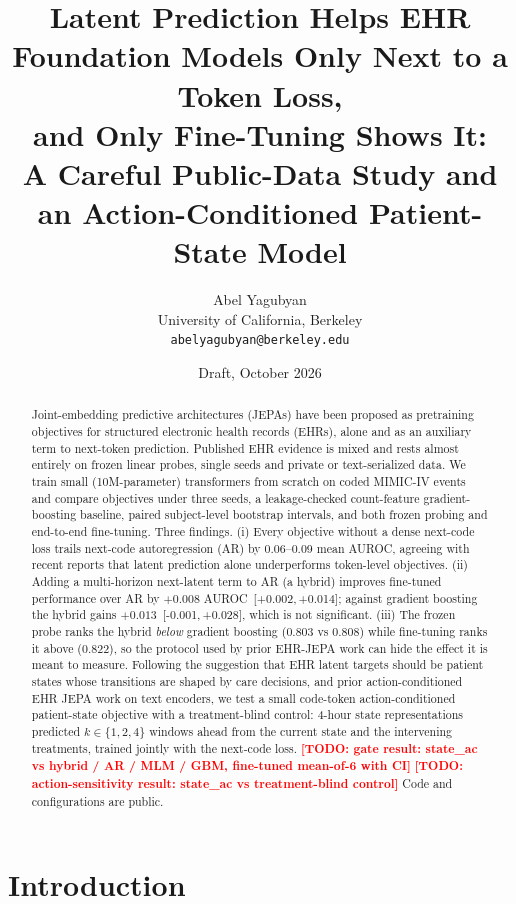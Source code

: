 \documentclass[10pt,letterpaper]{article}
\title{\textbf{Latent Prediction Helps EHR Foundation Models Only Next to a Token Loss,\\
and Only Fine-Tuning Shows It:\\
A Careful Public-Data Study and an Action-Conditioned Patient-State Model}}
\author{Abel Yagubyan\\
\small University of California, Berkeley\\
\small \texttt{abelyagubyan@berkeley.edu}}
\date{Draft, October 2026}
\newcommand{\todo}[1]{\textcolor{red}{\textbf{[TODO: #1]}}}
\newcommand{\ci}[2]{\,[{#1},\,{#2}]}
\begin{document}
\maketitle

\begin{abstract}
Joint-embedding predictive architectures (JEPAs) have been proposed as
pretraining objectives for structured electronic health records (EHRs), alone
and as an auxiliary term to next-token prediction. Published EHR evidence is
mixed and rests almost entirely on frozen linear probes, single seeds and
private or text-serialized data. We train small (10M-parameter) transformers
from scratch on coded MIMIC-IV events and compare objectives under three
seeds, a leakage-checked count-feature gradient-boosting baseline, paired
subject-level bootstrap intervals, and both frozen probing and end-to-end
fine-tuning. Three findings. (i) Every objective without a dense next-code loss
trails next-code autoregression (AR) by 0.06--0.09 mean AUROC, agreeing with
recent reports that latent prediction alone underperforms token-level
objectives. (ii) Adding a multi-horizon next-latent term to AR (a hybrid)
improves fine-tuned performance over AR by $+0.008$ AUROC
\ci{+0.002}{+0.014}; against gradient boosting the hybrid gains $+0.013$
\ci{-0.001}{+0.028}, which is not significant. (iii) The frozen probe ranks the
hybrid \emph{below} gradient boosting (0.803 vs 0.808) while fine-tuning ranks it
above (0.822), so the protocol used by prior EHR-JEPA work can hide the effect
it is meant to measure. Following the suggestion that EHR latent targets
should be patient states whose transitions are shaped by care decisions, and
prior action-conditioned EHR JEPA work on text encoders, we test a small
code-token action-conditioned patient-state objective with a treatment-blind control: 4-hour state
representations predicted $k\in\{1,2,4\}$ windows ahead from the current state and
the intervening treatments, trained jointly with the next-code loss.
\todo{gate result: state\_ac vs hybrid / AR / MLM / GBM, fine-tuned mean-of-6 with CI}
\todo{action-sensitivity result: state\_ac vs treatment-blind control}
Code and configurations are public.
\end{abstract}

\section{Introduction}
\label{sec:intro}
\end{document}
